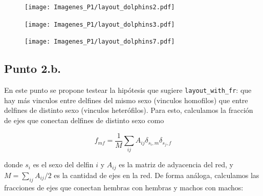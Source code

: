 \documentclass{article}
\begin{document}
\begin{figure}[!htb]
   \begin{minipage}{0.3\textwidth}
	\centering
	\texttt{[image: Imagenes\_P1/layout\_dolphins2.pdf]}
	\label{pt2layoutsfr}
   \end{minipage}\hfill
   \begin{minipage}{0.3\textwidth}
	\centering
	\texttt{[image: Imagenes\_P1/layout\_dolphins3.pdf]}
	\label{pt2layouttree}
   \end{minipage}\hfill
   \begin{minipage}{0.3\textwidth}
	\centering
	\texttt{[image: Imagenes\_P1/layout\_dolphins7.pdf]}
	\label{pt2layoutgrid}
   \end{minipage}
   \label{pt2layouts}
\end{figure}


\subsection{Punto 2.b.}
En este punto se propone testear la hipótesis que sugiere \texttt{layout\_with\_fr}: que hay más vinculos entre delfines del mismo sexo (vinculos homofilos) que entre delfines de distinto sexo (vinculos heter\'ofilos). Para esto, calculamos la fracción de ejes que conectan delfines de distinto sexo como

\begin{equation}
    f_{mf} = \frac{1}{M}\sum_{ij} A_{ij} \delta_{s_i,m} \delta_{s_j,f}
\end{equation}

donde $s_i$ es el sexo del delfin $i$ y $A_{ij}$ es la matriz de adyacencia del red, y $M = \sum_{ij} A_{ij}/2$ es la cantidad de ejes en la red. De forma análoga, calculamos las fracciones de ejes que conectan hembras con hembras y machos con machos:
\end{document}
